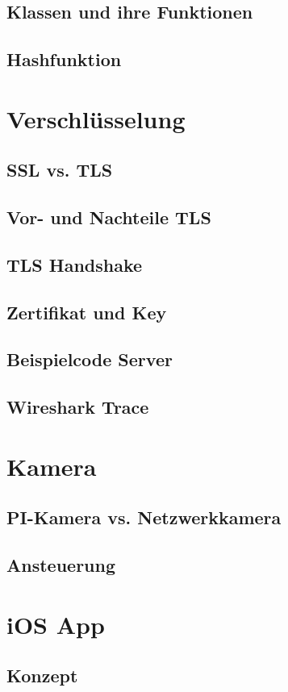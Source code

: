\documentclass[12pt,a4paper]{scrreprt}
\begin{document}
\subsection{Klassen und ihre Funktionen}
\subsection{Hashfunktion}

\section{Verschlüsselung}
\subsection{SSL vs. TLS}
\subsection{Vor- und Nachteile TLS}
\subsection{TLS Handshake}
\subsection{Zertifikat und Key}
\subsection{Beispielcode Server}
\subsection{Wireshark Trace}

\section{Kamera}
\subsection{PI-Kamera vs. Netzwerkkamera}
\subsection{Ansteuerung}

\section{iOS App}
\subsection{Konzept}
\end{document}
